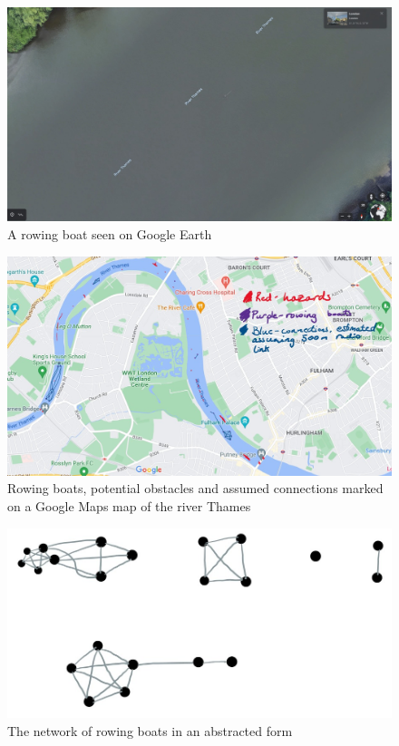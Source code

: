 \documentclass[12pt,a4paper]{report}
\begin{document}
\begin{figure}[h]
\caption{A rowing boat seen on Google Earth \cite{earth}}
\begin{center}
\includegraphics[scale=0.2]{earthSculler.jpg}
\end{center}
\end{figure}
\begin{figure}[h]
\begin{center}
\includegraphics[scale=0.4]{mapsmarked.jpg}
\end{center}
\caption{Rowing boats, potential obstacles and assumed connections marked on a Google Maps map of the river Thames}
\end{figure}
\begin{figure}[h]
\begin{center}
\includegraphics[scale=0.5]{lines.jpg}
\end{center}
\caption{The network of rowing boats in an abstracted form}
\end{figure}
\FloatBarrier
\end{document}
